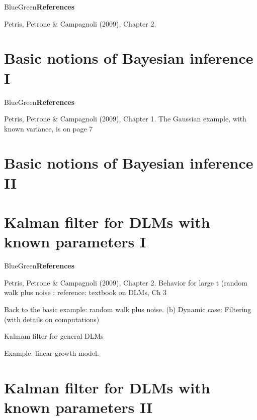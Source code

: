 \documentclass[dvipsnames,12pt]{book}
\begin{document}
        \begin{mybox}{BlueGreen}{\textbf{References}}

            Petris, Petrone \& Campagnoli (2009), Chapter 2.
            
        \end{mybox}

    \chapter{Basic notions of Bayesian inference I}

        \begin{mybox}{BlueGreen}{\textbf{References}}

            Petris, Petrone \& Campagnoli (2009), Chapter 1. The Gaussian example, with known variance, is on page 7
            
        \end{mybox}

    \chapter{Basic notions of Bayesian inference II}


    \chapter[Kalman filter for DLMs I]{Kalman filter for DLMs with known parameters I}

        \begin{mybox}{BlueGreen}{\textbf{References}}

            Petris, Petrone \& Campagnoli (2009), Chapter 2.
            Behavior for large t (random walk plus noise : reference: textbook on DLMs, Ch 3
            
        \end{mybox}

        Back to the basic example: random walk plus noise. (b) Dynamic case: Filtering (with details on computations)

        Kalmam filter for general DLMs

        Example: linear growth model.

    \chapter[Kalman filter for DLMs II]{Kalman filter for DLMs with known parameters II}
\end{document}
